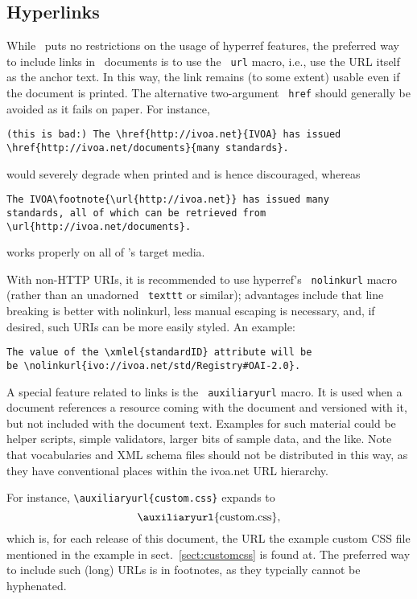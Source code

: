 \documentclass[11pt,a4paper]{ivoa}
\newcommand{\texword}[1]{\texttt{\color{texcolor} #1}}
\begin{document}
\subsection{Hyperlinks}
\label{sect:links}

While \ivoatex\ puts no restrictions on the usage of hyperref features,
the preferred way to include links in \ivoatex\ documents is to use the
\texword{url} macro, i.e., use the URL itself as the anchor text.  In
this way, the link remains (to some extent) usable even if the document
is printed.  The alternative two-argument \texword{href} should
generally be avoided as it fails on paper.  For instance,
\begin{lstlisting}
(this is bad:) The \href{http://ivoa.net}{IVOA} has issued
\href{http://ivoa.net/documents}{many standards}.
\end{lstlisting}
would severely degrade when printed and is hence discouraged, whereas
\begin{lstlisting}
The IVOA\footnote{\url{http://ivoa.net}} has issued many 
standards, all of which can be retrieved from 
\url{http://ivoa.net/documents}.
\end{lstlisting}
works properly on all of \ivoatex's target media.

With non-HTTP URIs, it is recommended to use hyperref's
\texword{nolinkurl} macro (rather than an unadorned \texword{texttt} or
similar); advantages include that line breaking is better with
nolinkurl, less manual escaping is necessary, and, if desired, 
such URIs can be more easily styled.  An example:

\begin{lstlisting}
The value of the \xmlel{standardID} attribute will be
be \nolinkurl{ivo://ivoa.net/std/Registry#OAI-2.0}.
\end{lstlisting}

A special feature related to links is the \texword{auxiliaryurl} macro.
It is used when a document references a resource coming with the
document and versioned with it, but not included with the document text.
Examples for such material could be helper scripts, simple validators,
larger bits of sample data, and the like.  Note that vocabularies and
XML schema files should not be distributed in this way, as they have
conventional places within the ivoa.net URL hierarchy.

For instance, \verb|\auxiliaryurl{custom.css}| expands to
$$\hbox{\auxiliaryurl{custom.css},}$$ which is, for each release of this
document, the URL the example custom CSS file mentioned in the example
in sect.~\ref{sect:customcss} is found at.  The preferred way to include
such (long) URLs is in footnotes, as they typcially cannot be hyphenated.
\end{document}
